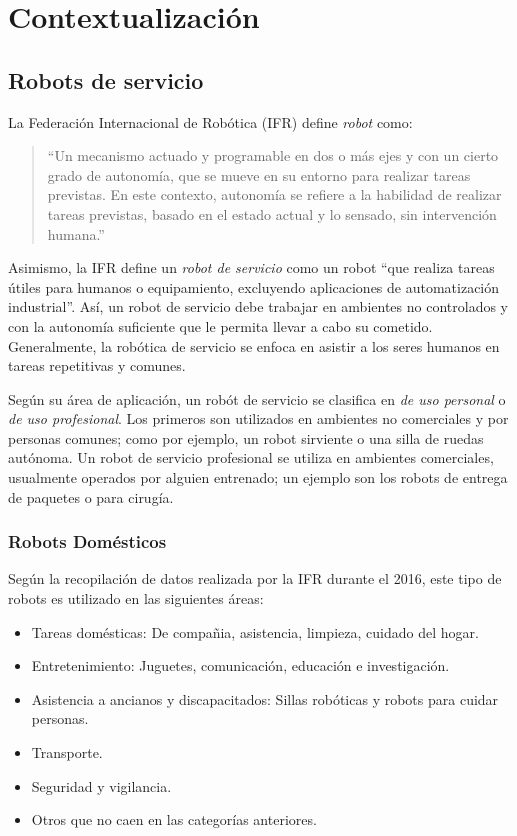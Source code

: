 
\chapter{Contextualizaci\'on}

\section{Robots de servicio}

La Federaci\'on Internacional de Rob\'otica (IFR)\cite{IFR} define \textit{robot} como:
\begin{quotation}
``Un mecanismo actuado y programable en dos o m\'as ejes y con un cierto grado de autonom\'ia, que se mueve en su entorno para realizar tareas previstas. En este contexto, autonom\'ia se refiere a la habilidad de realizar tareas previstas, basado en el estado actual y lo sensado, sin intervenci\'on humana.''
\end{quotation}

Asimismo, la IFR define un \textit{robot de servicio} como un robot ``que realiza tareas \'utiles para humanos o equipamiento, excluyendo aplicaciones de automatizaci\'on industrial''. As\'i, un robot de servicio debe trabajar en ambientes no controlados y con la autonom\'ia suficiente que le permita llevar a cabo su cometido. Generalmente, la rob\'otica de servicio se enfoca en asistir a los seres humanos en tareas repetitivas y comunes.

Seg\'un su \'area de aplicaci\'on, un rob\'ot de servicio se clasifica en \textit{de uso personal} o \textit{de uso profesional}. Los primeros son utilizados en ambientes no comerciales y por personas comunes; como por ejemplo, un robot sirviente o una silla de ruedas aut\'onoma. Un robot de servicio profesional se utiliza en ambientes comerciales, usualmente operados por alguien entrenado; un ejemplo son los robots de entrega de paquetes o para cirug\'ia.


\subsection{Robots Dom\'esticos}

Seg\'un la recopilaci\'on de datos realizada por la IFR durante el 2016, este tipo de robots es utilizado en las siguientes \'areas:
\begin{itemize}[topsep=0pt]
\setlength\itemsep{0.2em}
\item Tareas dom\'esticas: De compa\~nia, asistencia, limpieza, cuidado del hogar.
\item Entretenimiento: Juguetes, comunicaci\'on, educaci\'on e investigaci\'on.
\item Asistencia a ancianos y discapacitados: Sillas rob\'oticas y robots para cuidar personas.
\item Transporte.
\item Seguridad y vigilancia.
\item Otros que no caen en las categor\'ias anteriores.
\end{itemize}
\bigskip

